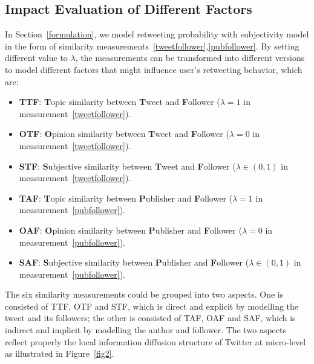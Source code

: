 \documentclass[twocolumn]{svjour3}          %
\begin{document}
\subsection{Impact Evaluation of Different Factors}
\label{influence}

In Section~\ref{formulation}, we model retweeting probability with subjectivity model in the form of similarity measurements~\ref{tweetfollower},\ref{pubfollower}.
By setting different value to $ \lambda $, the measurements can be transformed into different versions to model different factors that might influence user's retweeting behavior, which are:
\begin{itemize}
\item \textbf{TTF}: \textbf{T}opic similarity between \textbf{T}weet and \textbf{F}ollower ($\lambda =1$ in measurement~\ref{tweetfollower}). 
\item \textbf{OTF}: \textbf{O}pinion similarity between \textbf{T}weet and \textbf{F}ollower ($ \lambda =0 $ in measurement~\ref{tweetfollower}). 
\item \textbf{STF}: \textbf{S}ubjective similarity between \textbf{T}weet and \textbf{F}ollower ($ \lambda \in ( 0,1 ) $ in measurement~\ref{tweetfollower}).  
\item \textbf{TAF}: \textbf{T}opic similarity between \textbf{P}ublisher and \textbf{F}ollower ($ \lambda =1 $ in measurement~\ref{pubfollower}).  
\item \textbf{OAF}: \textbf{O}pinion similarity between \textbf{P}ublisher and \textbf{F}ollower ($ \lambda =0 $ in measurement~\ref{pubfollower}).
\item \textbf{SAF}: \textbf{S}ubjective similarity between \textbf{P}ublisher and \textbf{F}ollower ($ \lambda \in ( 0,1 ) $ in measurement~\ref{pubfollower}). 
\end{itemize}
The six similarity measurements could be grouped into two aspects. 
One is consisted of TTF, OTF and STF, which is direct and explicit by modelling the tweet and its followers;
the other is consisted of TAF, OAF and SAF, which is indirect and implicit by modelling the author and follower.
The two aspects reflect properly the local information diffusion structure of Twitter at micro-level as illustrated in Figure~\ref{fig2}.
\end{document}
